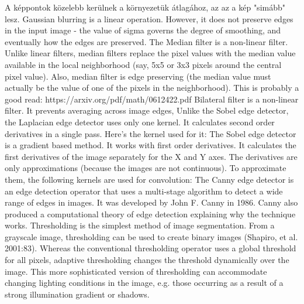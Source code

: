 
A képpontok közelebb kerülnek a környezetük átlagához, az az a kép "simább" lesz.
Gaussian blurring is a linear operation. However, it does not preserve edges in the input image - the value of sigma governs the degree of smoothing, and eventually how the edges are preserved.
The Median filter is a non-linear filter. Unlike linear filters, median filters replace the pixel values with the median value available in the local neighborhood (say, 5x5 or 3x3 pixels around the central pixel value). Also, median filter is edge preserving (the median value must actually be the value of one of the pixels in the neighborhood). This is probably a good read:
https://arxiv.org/pdf/math/0612422.pdf
Bilateral filter is a non-linear filter. It prevents averaging across image edges, 
Unlike the Sobel edge detector, the Laplacian edge detector uses only one kernel. It calculates second order derivatives in a single pass. Here's the kernel used for it:
The Sobel edge detector is a gradient based method. It works with first order derivatives. It calculates the first derivatives of the image separately for the X and Y axes. The derivatives are only approximations (because the images are not continuous). To approximate them, the following kernels are used for convolution:
The Canny edge detector is an edge detection operator that uses a multi-stage algorithm to detect a wide range of edges in images. It was developed by John F. Canny in 1986. Canny also produced a computational theory of edge detection explaining why the technique works.
Thresholding is the simplest method of image segmentation. From a grayscale image, thresholding can be used to create binary images (Shapiro, et al. 2001:83).
Whereas the conventional thresholding operator uses a global threshold for all pixels, adaptive thresholding changes the threshold dynamically over the image. This more sophisticated version of thresholding can accommodate changing lighting conditions in the image, e.g. those occurring as a result of a strong illumination gradient or shadows.


